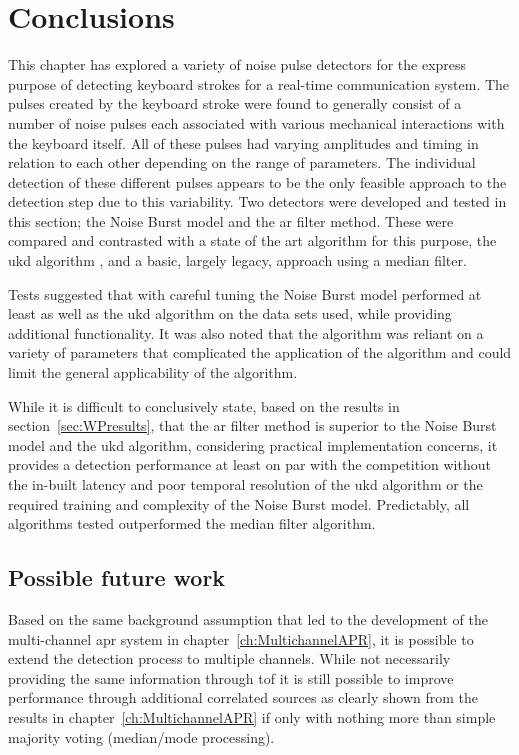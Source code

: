 \section{Conclusions}\label{sec:WPconclusions}

This chapter has explored a variety of noise pulse detectors for the express purpose of detecting keyboard strokes for a real-time communication system. The pulses created by the keyboard stroke were found to generally consist of a number of noise pulses each associated with various mechanical interactions with the keyboard itself. All of these pulses had varying amplitudes and timing in relation to each other depending on the range of parameters. The individual detection of these different pulses appears to be the only feasible approach to the detection step due to this variability. Two detectors were developed and tested in this section; the Noise Burst model and the \gls{ar} filter method. These were compared and contrasted with a state of the art algorithm for this purpose, the \gls{ukd} algorithm \cite{Subramanya2007}, and a basic, largely legacy, approach using a median filter.

Tests suggested that with careful tuning the Noise Burst model performed at least as well as the \gls{ukd} algorithm on the data sets used, while providing additional functionality. It was also noted that the algorithm was reliant on a variety of parameters that complicated the application of the algorithm and could limit the general applicability of the algorithm.

While it is difficult to conclusively state, based on the results in section~\ref{sec:WPresults}, that the \gls{ar} filter method is superior to the Noise Burst model and the \gls{ukd} algorithm, considering practical implementation concerns, it provides a detection performance at least on par with the competition without the in-built latency and poor temporal resolution of the \gls{ukd} algorithm or the required training and complexity of the Noise Burst model. Predictably, all algorithms tested outperformed the median filter algorithm.

\subsection{Possible future work}
Based on the same background assumption that led to the development of the multi-channel \gls{apr} system in chapter~\ref{ch:MultichannelAPR}, it is possible to extend the detection process to multiple channels. While not necessarily providing the same information through \gls{tof} it is still possible to improve performance through additional correlated sources as clearly shown from the results in chapter~\ref{ch:MultichannelAPR} if only with nothing more than simple majority voting (median/mode processing).


